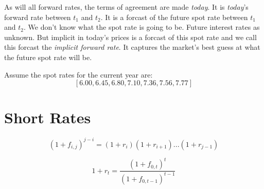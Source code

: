 As will all forward rates, the terms of agreement are made \textit{today}. 
It is \textit{today}'s forward rate between $t_1$ and $t_2$. 
It is a forcast of the future spot rate between $t_1$ and $t_2$. 
We don't know what the spot rate is going to be. Future interest 
rates as unknown. But implicit 
in today's prices is a forcast of this spot rate and we call 
this forcast the \textit{implicit forward rate}. It captures 
the market's best guess at what the future spot rate will be.

\frmrule

\begin{example}
Assume the spot rates for the current year are:
$$[6.00, 6.45, 6.80, 7.10, 7.36, 7.56, 7.77]$$
\end{example}

\frmrule


\section{Short Rates}



$$(1 + f_{i,j})^{j-i} = (1 + r_i)(1 + r_{i+1})...(1 + r_{j-1})$$

$$1 + r_t = \frac{(1 + f_{0,t})^{t}}{(1 + f_{0,t-1})^{t-1}}$$





